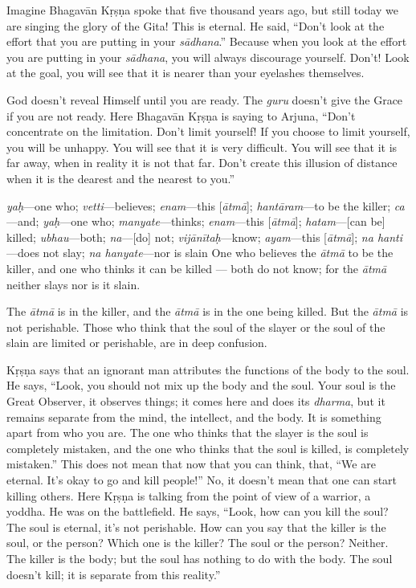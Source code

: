 Imagine Bhagavān Kṛṣṇa spoke that five thousand years ago, but still today we are singing the glory of the Gita! This is eternal. He said, “Don’t look at the effort that you are putting in your \textit{sādhana}.” Because when you look at the effort you are putting in your \textit{sādhana}, you will always discourage yourself. Don’t! Look at the goal, you will see that it is nearer than your eyelashes themselves.

God doesn’t reveal Himself until you are ready. The \textit{guru} doesn’t give the Grace if you are not ready. Here Bhagavān Kṛṣṇa is saying to Arjuna, “Don’t concentrate on the limitation. Don’t limit yourself! If you choose to limit yourself, you will be unhappy. You will see that it is very difficult. You will see that it is far away, when in reality it is not that far. Don’t create this illusion of distance when it is the dearest and the nearest to you.”

{%
  \textit{yaḥ}---one who; 
  \textit{vetti}---believes; 
  \textit{enam}---this [\textit{ātmā}]; 
  \textit{hantāram}---to be the killer; 
  \textit{ca}---and; 
  \textit{yaḥ}---one who; 
  \textit{manyate}---thinks; 
  \textit{enam}---this [\textit{ātmā}]; 
  \textit{hatam}---[can be] killed; 
  \textit{ubhau}---both; 
  \textit{na}---[do] not; 
  \textit{vijānītaḥ}---know; 
  \textit{ayam}---this [\textit{ātmā}]; 
  \textit{na hanti}---does not slay; 
  \textit{na hanyate}---nor is slain
}
{%
  One who believes the \textit{ātmā} to be the killer, and one who thinks it can be killed — both do not know; for the \textit{ātmā} neither slays nor is it slain.
}

The \textit{ātmā} is in the killer, and the \textit{ātmā} is in the one being killed. But the \textit{ātmā} is not perishable. Those who think that the soul of the slayer or the soul of the slain are limited or perishable, are in deep confusion.

Kṛṣṇa says that an ignorant man attributes the functions of the body to the soul. He says, “Look, you should not mix up the body and the soul. Your soul is the Great Observer, it observes things; it comes here and does its \textit{dharma}, but it remains separate from the mind, the intellect, and the body. It is something apart from who you are. The one who thinks that the slayer is the soul is completely mistaken, and the one who thinks that the soul is killed, is completely mistaken.” This does not mean that now that you can think, that, “We are eternal. It’s okay to go and kill people!” No, it doesn’t mean that one can start killing others. Here Kṛṣṇa is talking from the point of view of a warrior, a yoddha. He was on the battlefield. He says, “Look, how can you kill the soul? The soul is eternal, it’s not perishable. How can you say that the killer is the soul, or the person? Which one is the killer? The soul or the person? Neither. The killer is the body; but the soul has nothing to do with the body. The soul doesn’t kill; it is separate from this reality.”


